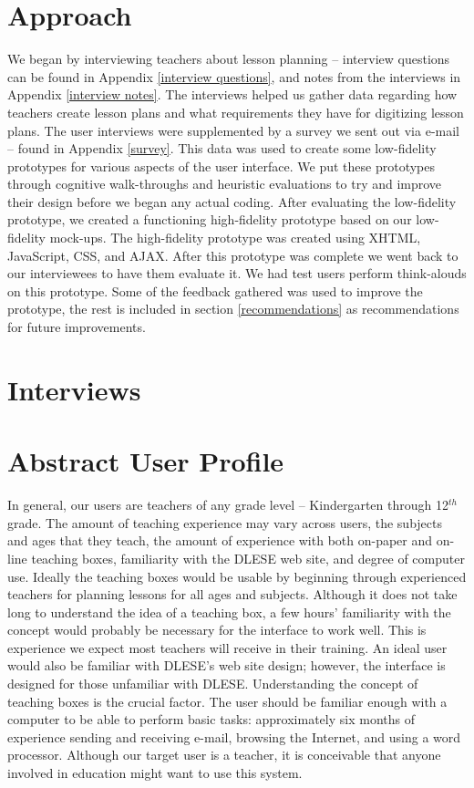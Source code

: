 \documentclass[10pt,letter]{article}
\begin{document}
\section{Approach}
We began by interviewing teachers about lesson planning -- interview questions
can be found in Appendix \ref{interview questions}, and notes from the
interviews in Appendix \ref{interview notes}. The interviews helped us gather
data regarding how teachers create lesson plans and what requirements they have
for digitizing lesson plans. The user interviews were supplemented by a survey
we sent out via e-mail -- found in Appendix \ref{survey}. This data was used to
create some low-fidelity prototypes for various aspects of the user interface.
We put these prototypes through cognitive walk-throughs and heuristic
evaluations to try and improve their design before we began any actual coding.
After evaluating the low-fidelity prototype, we created a functioning
high-fidelity prototype based on our low-fidelity mock-ups. The high-fidelity
prototype was created using XHTML, JavaScript, CSS, and AJAX. After this
prototype was complete we went back to our interviewees to have them evaluate
it. We had test users perform think-alouds on this prototype. Some of the
feedback gathered was used to improve the prototype, the rest is included in
section \ref{recommendations} as recommendations for future improvements.

\section{Interviews}


\section{Abstract User Profile}
In general, our users are teachers of any grade level -- Kindergarten through
12$^{th}$ grade. The amount of teaching experience may vary across users, the
subjects and ages that they teach, the amount of experience with both on-paper
and on-line teaching boxes, familiarity with the DLESE web site, and degree of
computer use.  Ideally the teaching boxes would be usable by beginning through
experienced teachers for planning lessons for all ages and subjects.  Although
it does not take long to understand the idea of a teaching box, a few
hours' familiarity with the concept would probably be necessary for the
interface to work well.  This is experience we expect most teachers will receive
in their training.  An ideal user would also be familiar with DLESE's web site
design; however, the interface is designed for those unfamiliar with DLESE.
Understanding the concept of teaching boxes is the crucial factor.  The user
should be familiar enough with a computer to be able to perform basic tasks:
approximately six months of experience sending and receiving e-mail, browsing
the Internet, and using a word processor.  Although our target user is a
teacher, it is conceivable that anyone involved in education might want to use
this system.
\end{document}
